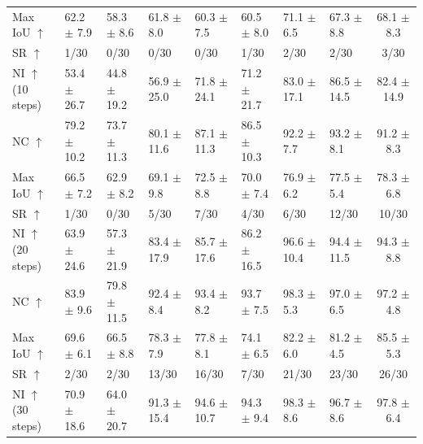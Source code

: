 \documentclass[journal]{IEEEtran}
\begin{document}
\begin{table}[t!]
{\begin{tabular}{p{1.8cm}|p{1.6cm}p{1.7cm}p{1.9cm}p{1.9cm}|p{2.1cm}p{1.9cm}p{2.2cm}||c}
Max IoU $\uparrow$ & 62.2 $\pm$ 7.9 & 58.3 $\pm$ 8.6 & 61.8 $\pm$ 8.0 & 60.3 $\pm$ 7.5 & 60.5 $\pm$ 8.0 & \cellcolor{green!25}71.1 $\pm$ 6.5 & \cellcolor{red!25}67.3 $\pm$ 8.8 & \cellcolor{yellow!25}68.1 $\pm$ 8.3 \\
SR $\uparrow$ & \cellcolor{red!25}1/30 & 0/30 & 0/30 & 0/30 & \cellcolor{red!25}1/30 & \cellcolor{yellow!25}2/30 & \cellcolor{yellow!25}2/30 & \cellcolor{green!25}3/30 \\
\hline
NI $\uparrow$ (10 steps) & 53.4 $\pm$ 26.7 & 44.8 $\pm$ 19.2 & 56.9 $\pm$ 25.0 & 71.8 $\pm$ 24.1 & 71.2 $\pm$ 21.7 & \cellcolor{yellow!25}83.0 $\pm$ 17.1 & \cellcolor{green!25}86.5 $\pm$ 14.5 & \cellcolor{red!25}82.4 $\pm$ 14.9 \\
NC $\uparrow$ & 79.2 $\pm$ 10.2 & 73.7 $\pm$ 11.3 & 80.1 $\pm$ 11.6 & 87.1 $\pm$ 11.3 & 86.5 $\pm$ 10.3 & \cellcolor{yellow!25}92.2 $\pm$ 7.7 & \cellcolor{green!25}93.2 $\pm$ 8.1 & \cellcolor{red!25}91.2 $\pm$ 8.3 \\
Max IoU $\uparrow$ & 66.5 $\pm$ 7.2 & 62.9 $\pm$ 8.2 & 69.1 $\pm$ 9.8 & 72.5 $\pm$ 8.8 & 70.0 $\pm$ 7.4 & \cellcolor{red!25}76.9 $\pm$ 6.2 & \cellcolor{yellow!25}77.5 $\pm$ 5.4 & \cellcolor{green!25}78.3 $\pm$ 6.8 \\
SR $\uparrow$ & 1/30 & 0/30 & 5/30 & \cellcolor{red!25}7/30 & 4/30 & 6/30 & \cellcolor{green!25}12/30 & \cellcolor{yellow!25}10/30 \\
\hline
NI $\uparrow$ (20 steps) & 63.9 $\pm$ 24.6 & 57.3 $\pm$ 21.9 & 83.4 $\pm$ 17.9 & 85.7 $\pm$ 17.6 & 86.2 $\pm$ 16.5 & \cellcolor{green!25}96.6 $\pm$ 10.4 & \cellcolor{yellow!25}94.4 $\pm$ 11.5 & \cellcolor{red!25}94.3 $\pm$ 8.8 \\
NC $\uparrow$ & 83.9 $\pm$ 9.6 & 79.8 $\pm$ 11.5 & 92.4 $\pm$ 8.4 & 93.4 $\pm$ 8.2 & 93.7 $\pm$ 7.5 & \cellcolor{green!25}98.3 $\pm$ 5.3 & \cellcolor{red!25}97.0 $\pm$ 6.5 & \cellcolor{yellow!25}97.2 $\pm$ 4.8 \\
Max IoU $\uparrow$ & 69.6 $\pm$ 6.1 & 66.5 $\pm$ 8.8 & 78.3 $\pm$ 7.9 & 77.8 $\pm$ 8.1 & 74.1 $\pm$ 6.5 & \cellcolor{yellow!25}82.2 $\pm$ 6.0 & \cellcolor{red!25}81.2 $\pm$ 4.5 & \cellcolor{green!25}85.5 $\pm$ 5.3 \\
SR $\uparrow$ & 2/30 & 2/30 & 13/30 & 16/30 & 7/30 & \cellcolor{red!25}21/30 & \cellcolor{yellow!25}23/30 & \cellcolor{green!25}26/30 \\
\hline
NI $\uparrow$ (30 steps) & 70.9 $\pm$ 18.6 & 64.0 $\pm$ 20.7 & 91.3 $\pm$ 15.4 & 94.6 $\pm$ 10.7 & 94.3 $\pm$ 9.4 & \cellcolor{green!25}98.3 $\pm$ 8.6 & \cellcolor{red!25}96.7 $\pm$ 8.6 & \cellcolor{yellow!25}97.8 $\pm$ 6.4 \\

\end{tabular}}
\end{table}
\end{document}
